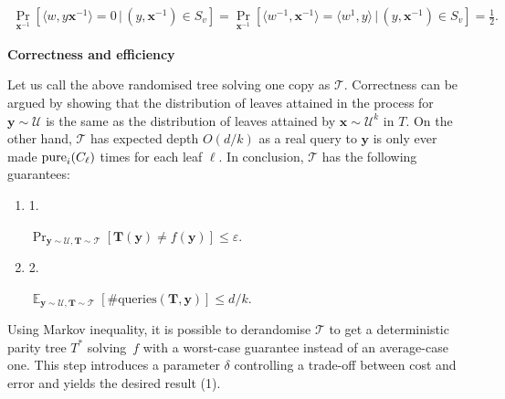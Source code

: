 \[\begin{gathered}
\Pr_{\bm{x}^{-1}}\left[\langle w,y\bm{x}^{-1}\rangle=0\,|\,(y,\bm{x}^{-1})\in S_{v}\right]=\Pr_{\bm{x}^{-1}}\left[\langle w^{-1},\bm{x}^{-1}\rangle=\langle w^{1},y\rangle\,|\,(y,\bm{x}^{-1})\in S_{v}\right]=\frac{1}{2}.
\end{gathered}\]





\par\medskip\noindent\textbf{Correctness and efficiency}\par




Let us call the above randomised tree solving one copy as $\mathcal{T}$. Correctness can be argued by showing that the distribution of leaves attained in the process for $\bm{y}\sim\mathcal{U}$ is the same as the distribution of leaves attained by $\bm{x}\sim\mathcal{U}^{k}$ in $T$. On the other hand, $\mathcal{T}$ has expected depth $O(d/k)$ as a real query to $\bm{y}$ is only ever made $\mathop{\textup{pure}}_{i}(C_{\ell})$ times for each leaf $\ell$. In conclusion, $\mathcal{T}$ has the following guarantees:\par


\begin{enumerate}


\item[] 
1. 


$\Pr_{\bm{y}\sim\mathcal{U},\bm{T}\sim\mathcal{T}}[\bm{T}(\bm{y})\neq f(\bm{y})]\leq\varepsilon$.\par





\item[] 
2. 


$\mathop{\mathbb{E}}_{\bm{y}\sim\mathcal{U},\bm{T}\sim\mathcal{T}}[\text{\#queries}(\bm{T},\bm{y})]\leq d/k$.\par





\end{enumerate}


Using Markov inequality, it is possible to derandomise $\mathcal{T}$ to get a deterministic parity tree $T^{*}$ solving $f$ with a worst-case guarantee instead of an average-case one. This step introduces a parameter $\delta$ controlling a trade-off between cost and error and yields the desired result (1).\par





